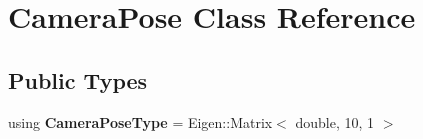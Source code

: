 \hypertarget{class_camera_pose}{\section{Camera\-Pose Class Reference}
\label{class_camera_pose}
}
\subsection*{Public Types}
\begin{DoxyCompactItemize}
\item 
\hypertarget{class_camera_pose_a6898788bbfddfab4a5bf78d911477bf4}{using {\bfseries Camera\-Pose\-Type} = Eigen\-::\-Matrix$<$ double, 10, 1 $>$}\label{class_camera_pose_a6898788bbfddfab4a5bf78d911477bf4}

\end{DoxyCompactItemize}
